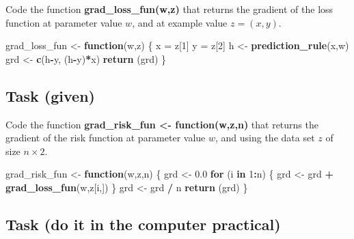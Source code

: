 \documentclass[
]{article}
\newenvironment{Shaded}{\begin{snugshade}}{\end{snugshade}}
\newcommand{\ControlFlowTok}[1]{\textcolor[rgb]{0.13,0.29,0.53}{\textbf{#1}}}
\newcommand{\DecValTok}[1]{\textcolor[rgb]{0.00,0.00,0.81}{#1}}
\newcommand{\FloatTok}[1]{\textcolor[rgb]{0.00,0.00,0.81}{#1}}
\newcommand{\KeywordTok}[1]{\textcolor[rgb]{0.13,0.29,0.53}{\textbf{#1}}}
\newcommand{\NormalTok}[1]{#1}
\newcommand{\OperatorTok}[1]{\textcolor[rgb]{0.81,0.36,0.00}{\textbf{#1}}}
\newcommand{\StringTok}[1]{\textcolor[rgb]{0.31,0.60,0.02}{#1}}
\begin{document}
Code the function \textbf{grad\_loss\_fun(w,z)} that returns the
gradient of the loss function at parameter value \(w\), and at example
value \(z=(x,y)\).

\begin{Shaded}
\begin{Highlighting}[]
\NormalTok{grad\_loss\_fun \textless{}{-}}\StringTok{ }\ControlFlowTok{function}\NormalTok{(w,z) \{}
\NormalTok{  x =}\StringTok{ }\NormalTok{z[}\DecValTok{1}\NormalTok{]}
\NormalTok{  y =}\StringTok{ }\NormalTok{z[}\DecValTok{2}\NormalTok{]}
\NormalTok{  h \textless{}{-}}\StringTok{ }\KeywordTok{prediction\_rule}\NormalTok{(x,w)}
\NormalTok{  grd \textless{}{-}}\StringTok{ }\KeywordTok{c}\NormalTok{(h}\OperatorTok{{-}}\NormalTok{y, (h}\OperatorTok{{-}}\NormalTok{y)}\OperatorTok{*}\NormalTok{x)}
  \KeywordTok{return}\NormalTok{ (grd)}
\NormalTok{\}}
\end{Highlighting}
\end{Shaded}

\hypertarget{task-given-1}{%
\subsection{Task (given)}\label{task-given-1}}

Code the function \textbf{grad\_risk\_fun \textless- function(w,z,n)}
that returns the gradient of the risk function at parameter value \(w\),
and using the data set \(z\) of size \(n\times 2\).

\begin{Shaded}
\begin{Highlighting}[]
\NormalTok{grad\_risk\_fun \textless{}{-}}\StringTok{ }\ControlFlowTok{function}\NormalTok{(w,z,n) \{}
\NormalTok{  grd \textless{}{-}}\StringTok{ }\FloatTok{0.0}
  \ControlFlowTok{for}\NormalTok{ (i }\ControlFlowTok{in} \DecValTok{1}\OperatorTok{:}\NormalTok{n) \{}
\NormalTok{    grd \textless{}{-}}\StringTok{ }\NormalTok{grd }\OperatorTok{+}\StringTok{ }\KeywordTok{grad\_loss\_fun}\NormalTok{(w,z[i,])}
\NormalTok{  \}}
\NormalTok{  grd \textless{}{-}}\StringTok{ }\NormalTok{grd }\OperatorTok{/}\StringTok{ }\NormalTok{n}
  \KeywordTok{return}\NormalTok{ (grd)}
\NormalTok{\}}
\end{Highlighting}
\end{Shaded}

\hypertarget{task-do-it-in-the-computer-practical}{%
\subsection{Task (do it in the computer
practical)}\label{task-do-it-in-the-computer-practical}}
\end{document}
